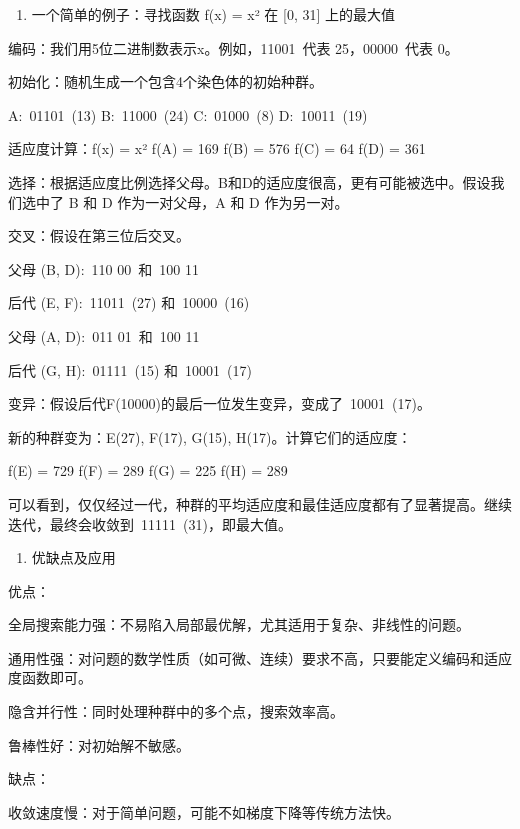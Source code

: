 \begin{enumerate}
\def\labelenumi{\arabic{enumi}.}
\setcounter{enumi}{2}
\tightlist
\item
  一个简单的例子：寻找函数 f(x) = x² 在 {[}0, 31{]} 上的最大值
\end{enumerate}

编码：我们用5位二进制数表示x。例如，11001~代表 25，00000~代表 0。

初始化：随机生成一个包含4个染色体的初始种群。

A:~01101~(13) B:~11000~(24) C:~01000~(8) D:~10011~(19)

适应度计算：f(x) = x² f(A) = 169 f(B) = 576 f(C) = 64 f(D) = 361

选择：根据适应度比例选择父母。B和D的适应度很高，更有可能被选中。假设我们选中了 B 和 D 作为一对父母，A 和 D 作为另一对。

交叉：假设在第三位后交叉。

父母 (B, D):~110 \textbar{} 00~和~100 \textbar{} 11

后代 (E, F):~11011~(27) 和~10000~(16)

父母 (A, D):~011 \textbar{} 01~和~100 \textbar{} 11

后代 (G, H):~01111~(15) 和~10001~(17)

变异：假设后代F(10000)的最后一位发生变异，变成了~10001~(17)。

新的种群变为：E(27), F(17), G(15), H(17)。计算它们的适应度：

f(E) = 729 f(F) = 289 f(G) = 225 f(H) = 289

可以看到，仅仅经过一代，种群的平均适应度和最佳适应度都有了显著提高。继续迭代，最终会收敛到~11111~(31)，即最大值。

\begin{enumerate}
\def\labelenumi{\arabic{enumi}.}
\setcounter{enumi}{3}
\tightlist
\item
  优缺点及应用
\end{enumerate}

优点：

全局搜索能力强：不易陷入局部最优解，尤其适用于复杂、非线性的问题。

通用性强：对问题的数学性质（如可微、连续）要求不高，只要能定义编码和适应度函数即可。

隐含并行性：同时处理种群中的多个点，搜索效率高。

鲁棒性好：对初始解不敏感。

缺点：

收敛速度慢：对于简单问题，可能不如梯度下降等传统方法快。

